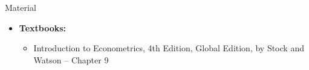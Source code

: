 \documentclass[notes,10pt, aspectratio=169]{beamer}
\begin{document}
\begin{frame}[allowframebreaks]{Material}
\begin{itemize}
    \item[--] \textbf{Textbooks:}
    \begin{itemize}
        \item Introduction to Econometrics, 4th Edition, Global Edition, by Stock and Watson -- Chapter 9
    \end{itemize}
\end{itemize}
\end{frame}
\end{document}
